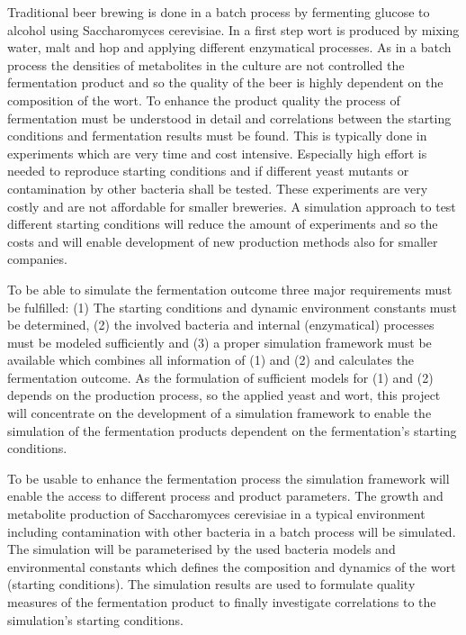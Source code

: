 Traditional beer brewing is done in a batch process by fermenting glucose to alcohol using Saccharomyces cerevisiae. In a first step wort
is produced by mixing water, malt and hop and applying different enzymatical processes. As in a batch process
the densities of metabolites in the culture are not controlled the fermentation product and so the quality of the beer is highly dependent
on the composition of the wort. To enhance the product quality the process of fermentation must be understood in detail and correlations
between the starting conditions and fermentation results must be found. This is typically done in experiments which are very time and cost
intensive. Especially high effort is needed to reproduce starting conditions and if different yeast mutants or contamination by other 
bacteria shall be tested. These experiments are very costly and are not affordable for smaller breweries. A simulation approach to test
different starting conditions will reduce the amount of experiments and so the costs and will enable development of new production methods
also for smaller companies.

To be able to simulate the fermentation outcome three major requirements must be fulfilled: (1) The starting conditions and dynamic environment
constants must be determined, (2) the involved bacteria and internal (enzymatical) processes must be modeled sufficiently and (3) a proper
simulation framework must be available which combines all information of (1) and (2) and calculates the fermentation outcome. As the 
formulation of sufficient models for (1) and (2) depends on the production process, so the applied yeast and wort, this project will
concentrate on the development of a simulation framework to enable the simulation of the fermentation products dependent on the fermentation's
starting conditions.

To be usable to enhance the fermentation process the simulation framework will enable the access to different process and product parameters.
The growth and metabolite production of Saccharomyces cerevisiae in a typical environment including contamination with other bacteria in a
batch process will be simulated. The simulation will be parameterised by the used bacteria models and environmental constants which defines
the composition and dynamics of the wort (starting conditions). The simulation results are used to formulate quality measures of the fermentation
product to finally investigate correlations to the simulation's starting conditions.

